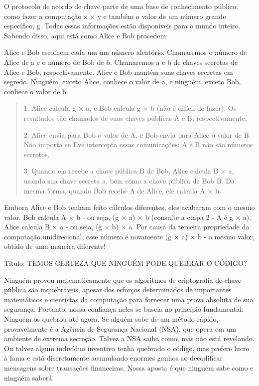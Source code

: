 \documentclass{book}
\begin{document}
O protocolo de acordo de chave parte de uma base de conhecimento público: como fazer a computação x × y e também o valor de um número grande específico, g. Todas essas informações estão disponíveis para o mundo inteiro. Sabendo disso, aqui está como Alice e Bob procedem:

Alice e Bob escolhem cada um um número aleatório. Chamaremos o número de Alice de a e o número de Bob de b. Chamaremos a e b de chaves secretas de Alice e Bob, respectivamente. Alice e Bob mantêm suas chaves secretas em segredo. Ninguém, exceto Alice, conhece o valor de a, e ninguém, exceto Bob, conhece o valor de b.
\begin{quote}
    1. Alice calcula g × a, e Bob calcula g × b (não é difícil de fazer). Os resultados são chamados de suas chaves públicas A e B, respectivamente.

    2. Alice envia para Bob o valor de A, e Bob envia para Alice o valor de B. Não importa se Eve intercepta essas comunicações; A e B não são números secretos.

    3. Quando ela recebe a chave pública B de Bob, Alice calcula B × a, usando sua chave secreta a, bem como a chave pública de Bob B. Da mesma forma, quando Bob recebe A de Alice, ele calcula A × b.
\end{quote}


Embora Alice e Bob tenham feito cálculos diferentes, eles acabaram com o mesmo valor. Bob calcula A × b - ou seja, (g × a) × b (consulte a etapa 2 - A é g × a). Alice calcula B × a - ou seja, (g × b) × a. Por causa da terceira propriedade da computação unidirecional, esse número é novamente (g × a) × b - o mesmo valor, obtido de uma maneira diferente!

Titulo: TEMOS CERTEZA QUE NINGUÉM PODE QUEBRAR O CÓDIGO?

Ninguém provou matematicamente que os algoritmos de criptografia de chave pública são inquebráveis, apesar dos esforços determinados de importantes matemáticos e cientistas da computação para fornecer uma prova absoluta de sua segurança. Portanto, nossa confiança neles se baseia no princípio fundamental: Ninguém os quebrou até agora. Se alguém sabe de um método rápido, provavelmente é a Agência de Segurança Nacional (NSA), que opera em um ambiente de extrema secreção. Talvez a NSA saiba como, mas não está revelando. Ou talvez algum indivíduo inventivo tenha quebrado o código, mas prefere lucro à fama e está discretamente acumulando enormes ganhos ao decodificar mensagens sobre transações financeiras. Nossa aposta é que ninguém sabe como e ninguém saberá.
\end{document}
